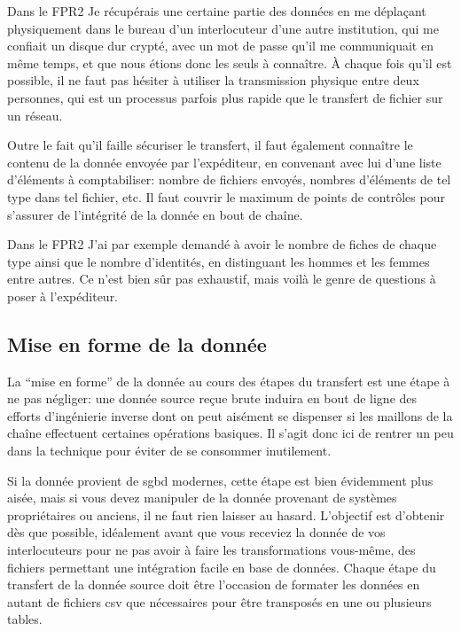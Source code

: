 \documentclass{book}
\begin{document}
\begin{bclogo}[arrondi = 0.1, couleur = blue!10, logo = \bcinfo]{Dans le FPR2}
Je récupérais une certaine partie des données en me déplaçant physiquement dans le bureau d'un interlocuteur d'une autre institution, qui me confiait un disque dur crypté, avec un mot de passe qu'il me communiquait en même temps, et que nous étions donc les seuls à connaître. À chaque fois qu'il est possible, il ne faut pas hésiter à utiliser la transmission physique entre deux personnes, qui est un processus parfois plus rapide que le transfert de fichier sur un réseau.
\end{bclogo}

Outre le fait qu'il faille sécuriser le transfert, il faut également connaître le contenu de la donnée envoyée par l'expéditeur, en convenant avec lui d'une liste d'éléments à comptabiliser: nombre de fichiers envoyés, nombres d'éléments de tel type dans tel fichier, etc. Il faut couvrir le maximum de points de contrôles pour s'assurer de l'intégrité de la donnée en bout de chaîne.

\begin{bclogo}[arrondi = 0.1, couleur = blue!10, logo = \bcinfo]{Dans le FPR2}
J'ai par exemple demandé à avoir le nombre de fiches de chaque type ainsi que le nombre d'identités, en distinguant les hommes et les femmes entre autres. Ce n'est bien sûr pas exhaustif, mais voilà le genre de questions à poser à l'expéditeur.
\end{bclogo}

\subsection{Mise en forme de la donnée}

La ``mise en forme'' de la donnée au cours des étapes du transfert est une étape à ne pas négliger: une donnée source reçue brute induira en bout de ligne des efforts d'ingénierie inverse dont on peut aisément se dispenser si les maillons de la chaîne effectuent certaines opérations basiques. Il s'agit donc ici de rentrer un peu dans la technique pour éviter de se consommer inutilement.

Si la donnée provient de \gls{sgbd} modernes, cette étape est bien évidemment plus aisée, mais si vous devez manipuler de la donnée provenant de systèmes propriétaires ou anciens, il ne faut rien laisser au hasard. L'objectif est d'obtenir dès que possible, idéalement avant que vous receviez la donnée de vos interlocuteurs pour ne pas avoir à faire les transformations vous-même, des fichiers permettant une intégration facile en base de données. Chaque étape du transfert de la donnée source doit être l'occasion de formater les données en autant de fichiers \gls{csv} que nécessaires pour être transposés en une ou plusieurs tables.
\end{document}
